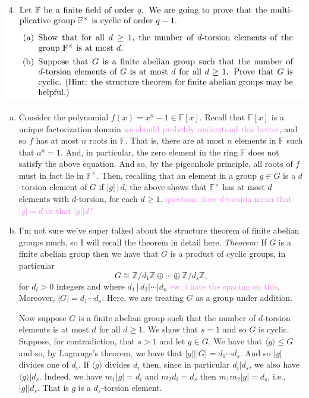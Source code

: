 \documentclass[12pt,letterpaper,boxed]{hmcpset}
\newcommand{\wg}[1]{\textcolor{violet}{#1}}
\newcommand{\Z}{\mathbb Z}
\newcommand{\abs}[1]{\left|#1\right|}
\newcommand{\anglee}[1]{\langle #1 \rangle}
\begin{document}
\begin{problem}
	\includegraphics[scale=0.8]{4.png}
	\hfill
\end{problem}

\begin{solution}

\begin{enumerate}[(a)]
\item Consider the polynomial $f(x) = x^n - 1 \in \mathbb F[x]$. 
Recall that $\mathbb F[x]$ is a unique factorization domain
\wg{we should probably understand this better}, and so $f$ has at most
$n$ roots in $\mathbb F$. That is, there are at most $n$ elements in
$\mathbb F$ such that $a^n = 1$. And, in particular, the zero element
in the ring $\mathbb F$ does not satisfy the above equation. And so,
by the pigeonhole principle, 
all roots of $f$ must in fact lie in $\mathbb F^\times$. 
Then, recalling that an element in a group $g \in G$ is a $d$-torsion
element of $G$ if $\abs g \,\vert \, d$, the above shows that $\mathbb
F^\times$ has at most $d$ elements with $d$-torsion, for each $d \geq
1$. 
\wg{question: does $d$-torsion mean that $\abs g = d$ or that $\abs g \vert d$?}


\item I'm not sure we've super talked about the structure theorem of
finite abelian groups much, so I will recall the theorem in detail
here. \textit{Theorem:} If $G$ is a finite abelian group then we have
that $G$ is a product of cyclic groups, in particular
\[
	G \cong \Z / d_1 \Z \oplus \cdots \oplus \Z /d_s \Z,
\]
for $d_i > 0$ integers and where $d_1 \, \vert \, d_2 \vert \cdots \vert
d_n$ \wg{ew, i hate the spacing on this}. Moreover, $\abs G = d_1
\cdots d_s$. Here, we are treating $G$
as a group under addition. 

Now suppose $G$ is a finite abelian group such that the number of
$d$-torsion elements is at most $d$ for all $d \geq 1$. We show that
$s = 1$ and so $G$ is cyclic. Suppose, for contradiction,
that $s > 1$ and let $g \in G$.
We have that $\anglee g \leq G$ and so, by Lagrange's theorem, we have
that $\abs g \vert \abs G = d_1 \cdots d_s$. And so $\abs g$ divides
one of $d_i$. If $\anglee g$ divides $d_i$ then, since in particular
$d_i \vert d_s$, we also have $\anglee g \vert d_s$.
Indeed, we have $m_1 \abs g = d_i$ and $m_2 d_i = d_s$ then $m_1m_2
\abs g = d_s$, i.e., $\abs g \vert d_s$. That is $g$ is a
$d_s$-torsion element.


\end{enumerate}
\end{solution}
\end{document}
